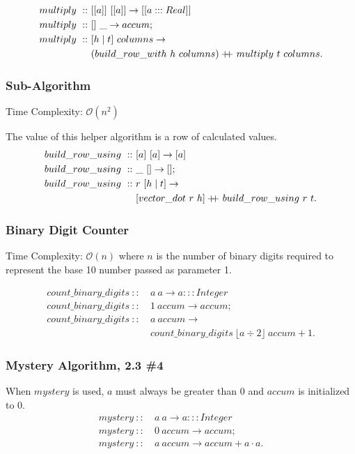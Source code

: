 \documentclass[a4paper,10pt]{book}
\newcommand\doubleplus{+\kern-1.3ex+\kern0.8ex}
\begin{document}
\begin{align*}
multiply\ ::\ &[[a]]\ [[a]]\rightarrow [[a:::Real]]\\
multiply\ ::\ &[]\ \_\rightarrow accum;\\
multiply\ ::\ &[h\mid t]\ columns\rightarrow\\
	&(build\_row\_with\ h\ columns)\doubleplus multiply\ t\ columns.
\end{align*}
\subsubsection{Sub-Algorithm}
Time Complexity: $\mathcal{O}(n^2)$

The value of this helper algorithm is a row of calculated values.
\begin{align*}
build\_row\_using\ ::\ &[a]\ [a]\rightarrow [a]\\
build\_row\_using\ ::\ &\_\ []\rightarrow [];\\
build\_row\_using\ ::\ &r\ [h\mid t]\rightarrow\\
&[vector\_dot\ r\ h]\doubleplus build\_row\_using\ r\ t.
\end{align*}

\subsubsection{Binary Digit Counter}Time Complexity: $\mathcal{O}(n)$ where $n$ is the number of binary digits required to represent the base 10 number passed as parameter 1.

\begin{align*}
count\_binary\_digits\ ::\ &a\ a\rightarrow a:::Integer\\
count\_binary\_digits\ ::\ &1\ accum\rightarrow accum;\\
count\_binary\_digits\ ::\ &a\ accum\rightarrow\\
	&count\_binary\_digits\ \lfloor a\div 2 \rfloor\ accum+1.
\end{align*}

\subsubsection{Mystery Algorithm, 2.3 \#4}

When $mystery$ is used, $a$ must always be greater than 0 and $accum$ is initialized to $0$.
\begin{align*}
mystery\ ::\ &a\ a\rightarrow a:::Integer\\
mystery\ ::\ &0\ accum\rightarrow accum;\\
mystery\ ::\ &a\ accum\rightarrow accum+ a\cdot a.
\end{align*}
\end{document}
